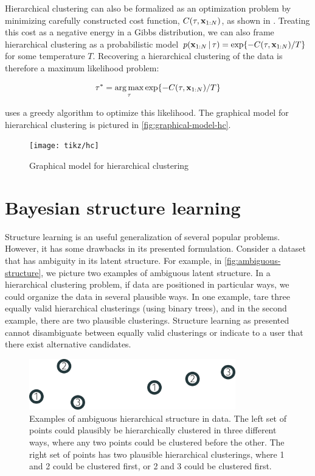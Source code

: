 Hierarchical clustering can also be formalized as an optimization problem
by minimizing carefully constructed cost
function,
$C(\tau, \mathbf{x}_{1:N})$,
as shown in \citet{Dasgupta2016}.
Treating this cost as a negative
energy in a Gibbs distribution,
we can also frame hierarchical clustering
as a probabilistic model
$\p(\dataset \given \tree) = \exp{-C(\tau, \dataset)/T}$ for some temperature $T$.
Recovering a hierarchical clustering of the
data is therefore a maximum likelihood problem:

\begin{align*}
    \tree^* = \argmax_{\tree} \exp{-C(\tau, \dataset)/T}
\end{align*}

\citet{Dasgupta2016} uses a greedy algorithm
to optimize this likelihood.
The graphical model for hierarchical clustering is pictured in \autoref{fig:graphical-model-hc}.

\begin{figure}[htp!]
    \centering
    \texttt{[image: tikz/hc]}
    \caption{Graphical model for hierarchical clustering}
    \label{fig:graphical-model-hc}
\end{figure}

\section{Bayesian structure learning}

Structure learning is an useful generalization
of several popular problems. However, it has some
drawbacks in its presented formulation.
Consider a dataset that has ambiguity in its
latent structure. For example, in \autoref{fig:ambiguous-structure}, we picture two examples of ambiguous latent structure. In a hierarchical clustering problem, if data are positioned in particular ways, we could organize the data
in several plausible ways. In one example, tare
three equally valid hierarchical clusterings (using binary trees), and in the second example, there are two
plausible clusterings. Structure learning as presented
cannot disambiguate between equally valid clusterings or indicate to a user that there exist alternative candidates.

\begin{figure}[htp!]
    \centering
    \includegraphics[width=0.8\textwidth]{img/structure/3-cluster-both}
    \caption{Examples of ambiguous hierarchical structure in data. The left set of points could plausibly be hierarchically clustered in three different ways, where any two points could be clustered before the other. The right set of points has two plausible hierarchical clusterings, where 1 and 2 could be clustered first, or 2 and 3 could be clustered first.}
    \label{fig:ambiguous-structure}
\end{figure}

